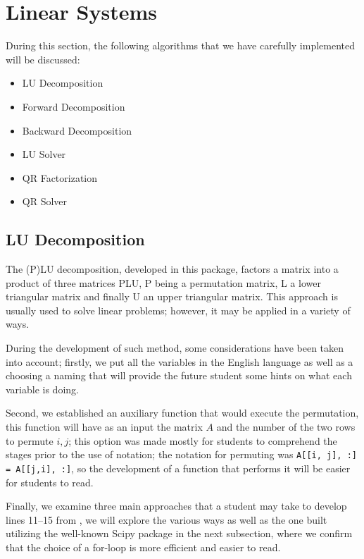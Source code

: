 \section{Linear Systems}
During this section, the following algorithms that we have carefully implemented will be discussed:
\begin{itemize}
    \item LU Decomposition  
    \item Forward Decomposition 
    \item Backward Decomposition 
    \item LU Solver 
    \item QR Factorization 
    \item QR Solver 
\end{itemize}

\subsection{LU Decomposition}
The (P)LU decomposition, developed in this package, factors a matrix into a product of three matrices PLU, P being a permutation matrix, L a lower triangular matrix and finally U an upper triangular matrix. This approach is usually used to solve linear problems; however, it may be applied in a variety of ways.

During the development of such method, some considerations have been taken into account; firstly, we put all the variables in the English language as well as a choosing a naming that will provide the future student some hints on what each variable is doing. 

Second, we established an auxiliary function that would execute the permutation, this function will have as an input the matrix $A$ and the number of the two rows to permute $i,j$; this option was made mostly for students to comprehend the stages prior to the use of notation; the notation for permuting was \lstinline|A[[i, j], :] = A[[j,i], :]|, so the development of a function that performs it will be easier for students to read.

Finally, we examine three main approaches that a student may take to develop lines 11–15 from , we will explore the various ways as well as the one built utilizing the well-known Scipy package in the next subsection, where we confirm that the choice of a for-loop is more efficient and easier to read.

